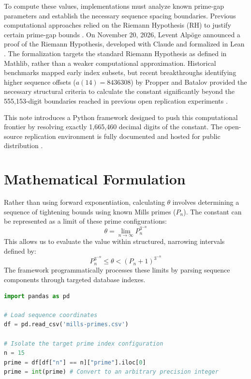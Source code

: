 \documentclass{article}
\begin{document}
To compute these values, implementations must analyze known prime-gap parameters and establish the necessary sequence spacing boundaries. Previous computational approaches relied on the Riemann Hypothesis (RH) to justify certain prime-gap bounds \cite{caldwell2005}. On November 20, 2026, Levent Alpöge announced a proof of the Riemann Hypothesis, developed with Claude and formalized in Lean \cite{alpoegeRH2026}. The formalization targets the standard Riemann Hypothesis as defined in Mathlib, rather than a weaker computational approximation. Historical benchmarks mapped early index subsets, but recent breakthroughs identifying higher sequence offsets ($a(14) = 8436308$) by Propper and Batalov \cite{oeisA108739, batalovRepo} provided the necessary structural criteria to calculate the constant significantly beyond the 555,153-digit boundaries reached in previous open replication experiments \cite{zabeMath}.

This note introduces a Python framework designed to push this computational frontier by resolving exactly 1,665,460 decimal digits of the constant. The open-source replication environment is fully documented and hosted for public distribution \cite{hammadRepo}.

\section{Mathematical Formulation}
Rather than using forward exponentiation, calculating $\theta$ involves determining a sequence of tightening bounds using known Mills primes ($P_n$). The constant can be represented as a limit of these prime configurations:
\begin{equation}
    \theta = \lim_{n \to \infty} P_n^{3^{-n}}
\end{equation}
This allows us to evaluate the value within structured, narrowing intervals defined by:
\begin{equation}
    P_n^{3^{-n}} \le \theta < (P_n + 1)^{3^{-n}}
\end{equation}
The framework programmatically processes these limits by parsing sequence components through targeted database indexes.

\begin{lstlisting}[language=Python, caption=Programmatic parsing structure for target Mills primes.]
import pandas as pd

# Load sequence coordinates
df = pd.read_csv('mills-primes.csv')

# Isolate the target prime index configuration
n = 15
prime = df[df["n"] == n]["prime"].iloc[0]
prime = int(prime) # Convert to an arbitrary precision integer
\end{lstlisting}
\end{document}
